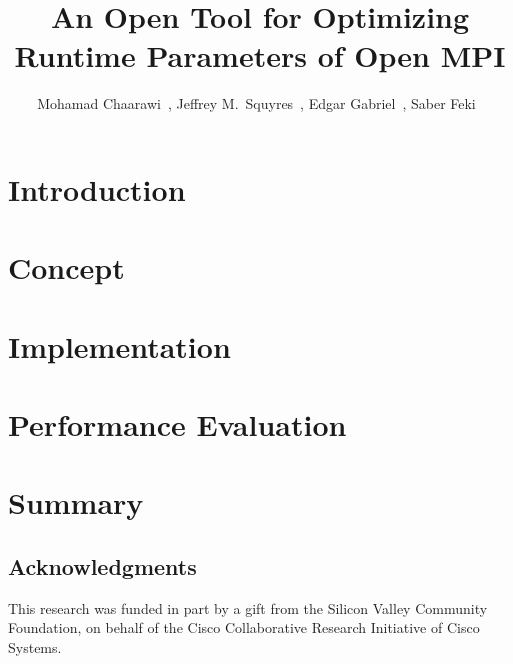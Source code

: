 \documentclass{llncs}
\begin{document}
\title{An Open Tool for Optimizing Runtime Parameters of Open MPI}

\author{
Mohamad Chaarawi~,
Jeffrey M.\ Squyres~,
Edgar Gabriel~,
Saber Feki~
}


\maketitle
\begin{abstract}

\end{abstract}

\section{Introduction}
\label{sec:intro}


\section{Concept}
\label{sec:concept}


\section{Implementation}
\label{sec:impl}


\section{Performance Evaluation}
\label{sec:eval}


\section{Summary}
\label{sec:summary}


\subsection*{Acknowledgments}
This research was funded in part by a gift from the Silicon Valley Community Foundation, on behalf of the Cisco Collaborative Research Initiative of Cisco Systems.



\noindent
\end{document}
